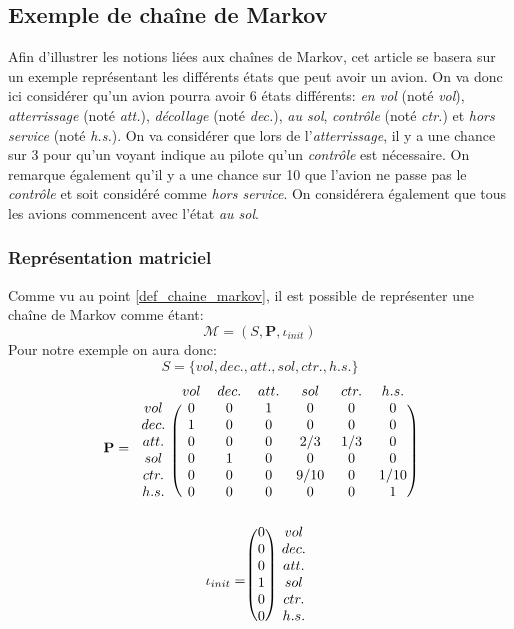 \documentclass[letterpaper]{article}
\begin{document}
  \subsection{Exemple de chaîne de Markov}
    \label{exemple}
    Afin d'illustrer les notions liées aux chaînes de Markov, cet article se 
    basera sur un exemple représentant les différents états que peut avoir 
    un avion.  On va donc ici considérer qu'un avion pourra avoir 6 états 
    différents: \textit{en vol} (noté \textit{vol}), \textit{atterrissage} 
    (noté \textit{att.}), \textit{décollage} (noté \textit{dec.}), 
    \textit{au sol}, \textit{contrôle} (noté \textit{ctr.})
    et \textit{hors service} (noté \textit{h.s.}).
    On va considérer que lors de l'\textit{atterrissage}, il y a une chance sur 
    3 pour qu'un voyant indique au pilote qu'un \textit{contrôle} est 
    nécessaire. On remarque également qu'il y a une chance sur 10 que 
    l'avion ne passe pas le \textit{contrôle} et soit considéré comme 
    \textit{hors service}.  On considérera également que tous les avions commencent
    avec l'état \textit{au sol}.
    
    \subsubsection{Représentation matriciel}
      Comme vu au point \ref{def_chaine_markov}, il est possible de représenter une
      chaîne de Markov comme étant:
      $$\mathcal{M} = (S, \mathbf{P}, \iota_{init})$$
      Pour notre exemple on aura donc:
      $$S = \{vol, dec., att., sol, ctr., h.s.\} $$
      $$ \mathbf{P} = 
	\begin{blockarray}{ccccccc}
	& vol & dec. & att. & sol & ctr. & h.s. \\
	  \begin{block}{c(cccccc)}
	    vol  & 0 & 0 & 1 & 0    & 0   & 0    \\
	    dec. & 1 & 0 & 0 & 0    & 0   & 0    \\
	    att. & 0 & 0 & 0 & 2/3  & 1/3 & 0    \\
	    sol  & 0 & 1 & 0 & 0    & 0   & 0    \\
	    ctr. & 0 & 0 & 0 & 9/10 & 0   & 1/10 \\
	    h.s. & 0 & 0 & 0 & 0    & 0   & 1    \\
	  \end{block}
	\end{blockarray}
      $$
      $$\iota_{init} = 
	\begin{blockarray}{cc}
	  \begin{block}{( c ) c}
	    0 & vol \\
	    0 & dec.\\
	    0 & att.\\
	    1 & sol\\
	    0 & ctr.\\
	    0 & h.s.\\
	  \end{block}
	\end{blockarray}
      $$
      
\end{document}
